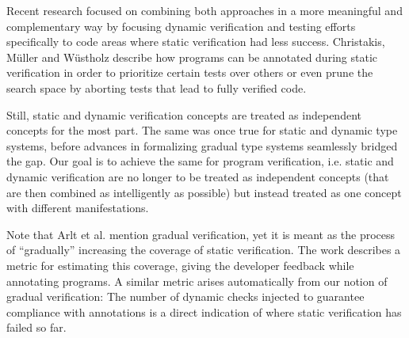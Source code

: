 Recent research focused on combining both approaches in a more meaningful and complementary way by focusing dynamic verification and testing efforts specifically to code areas where static verification had less success.
Christakis, Müller and Wüstholz \cite{ChristakisMuellerWuestholz16} describe how programs can be annotated during static verification in order to prioritize certain tests over others or even prune the search space by aborting tests that lead to fully verified code.

Still, static and dynamic verification concepts are treated as independent concepts for the most part.
The same was once true for static and dynamic type systems, before advances in formalizing gradual type systems seamlessly bridged the gap.
Our goal is to achieve the same for program verification, i.e. static and dynamic verification are no longer to be treated as independent concepts (that are then combined as intelligently as possible) but instead treated as one concept with different manifestations.

Note that Arlt et al. \cite{arlt2014gradual} mention gradual verification, yet it is meant as the process of “gradually” increasing the coverage of static verification.
The work describes a metric for estimating this coverage, giving the developer feedback while annotating programs.
A similar metric arises automatically from our notion of gradual verification: The number of dynamic checks injected to guarantee compliance with annotations is a direct indication of where static verification has failed so far.